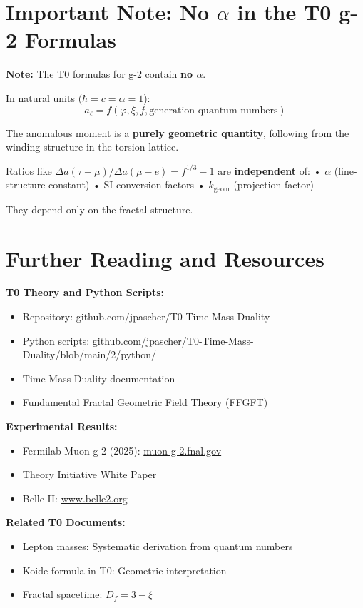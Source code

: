 	\section{Important Note: No $\alpha$ in the T0 g-2 Formulas}
	
	\textbf{Note:}
	The T0 formulas for g-2 contain \textbf{no $\alpha$}.
	
	In natural units ($\hbar = c = \alpha = 1$):
	\[ a_\ell = f(\varphi, \xi, f, \text{generation quantum numbers}) \]
	
	The anomalous moment is a \textbf{purely geometric quantity},
	following from the winding structure in the torsion lattice.
	
	Ratios like $\Delta a(\tau-\mu)/\Delta a(\mu-e) = f^{1/3} - 1$ are
	\textbf{independent} of:
	• $\alpha$ (fine-structure constant)
	• SI conversion factors
	• $k_{\text{geom}}$ (projection factor)
	
	They depend only on the fractal structure.
	
	\section*{Further Reading and Resources}
	
	\textbf{T0 Theory and Python Scripts:}
	\begin{itemize}
		\item Repository: github.com/jpascher/T0-Time-Mass-Duality
		\item Python scripts: github.com/jpascher/T0-Time-Mass-Duality/blob/main/2/python/
		\item Time-Mass Duality documentation
		\item Fundamental Fractal Geometric Field Theory (FFGFT)
	\end{itemize}
	
	\textbf{Experimental Results:}
	\begin{itemize}
		\item Fermilab Muon g-2 (2025): \href{https://muon-g-2.fnal.gov/}{muon-g-2.fnal.gov}
		\item Theory Initiative White Paper
		\item Belle II: \href{https://www.belle2.org/}{www.belle2.org}
	\end{itemize}
	
	\textbf{Related T0 Documents:}
	\begin{itemize}
		\item Lepton masses: Systematic derivation from quantum numbers
		\item Koide formula in T0: Geometric interpretation
		\item Fractal spacetime: $D_f = 3 - \xi$
	\end{itemize}
	